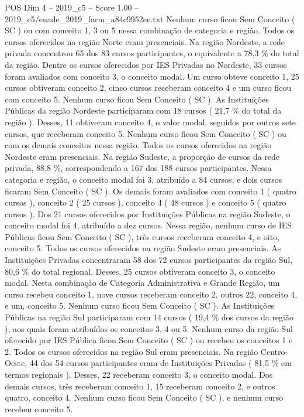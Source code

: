 \begin{textsample}{POS Dim 4 – 2019\_c5 – Score 1.00 – 2019\_c5/enade\_2019\_farm\_a84c9952ee.txt}
Nenhum curso ficou Sem Conceito ( SC ) ou com conceito 1, 3 ou 5 nessa combinação de categoria e região.
Todos os cursos oferecidos na região Norte eram presenciais.
Na região Nordeste, a rede privada concentrou 65 dos 83 cursos participantes, o equivalente a 78,3 \% do total da região.
Dentre os cursos oferecidos por IES Privadas no Nordeste, 33 cursos foram avaliados com conceito 3, o conceito modal.
Um curso obteve conceito 1, 25 cursos obtiveram conceito 2, cinco cursos receberam conceito 4 e um curso ficou com conceito 5.
Nenhum curso ficou Sem Conceito ( SC ).
As Instituições Públicas da região Nordeste participaram com 18 cursos ( 21,7 \% do total da região ).
Desses, 11 obtiveram conceito 4, o valor modal, seguidos por outros sete cursos, que receberam conceito 5.
Nenhum curso ficou Sem Conceito ( SC ) ou com os demais conceitos nessa região.
Todos os cursos oferecidos na região Nordeste eram presenciais.
Na região Sudeste, a proporção de cursos da rede privada, 88,8 \%, correspondendo a 167 dos 188 cursos participantes.
Nessa categoria e região, o conceito modal foi 3, atribuído a 84 cursos, e dois cursos ficaram Sem Conceito ( SC ).
Os demais foram avaliados com conceito 1 ( quatro cursos ), conceito 2 ( 25 cursos ), conceito 4 ( 48 cursos ) e conceito 5 ( quatro cursos ).
Dos 21 cursos oferecidos por Instituições Públicas na região Sudeste, o conceito modal foi 4, atribuído a dez cursos.
Nessa região, nenhum curso de IES Públicas ficou Sem Conceito ( SC ), três cursos receberam conceito 4, e oito, conceito 5.
Todos os cursos oferecidos na região Sudeste eram presenciais.
As Instituições Privadas concentraram 58 dos 72 cursos participantes da região Sul, 80,6 \% do total regional.
Desses, 25 cursos obtiveram conceito 3, o conceito modal.
Nesta combinação de Categoria Administrativa e Grande Região, um curso recebeu conceito 1, nove cursos receberam conceito 2, outros 22, conceito 4, e um, conceito 5.
Nenhum curso ficou Sem Conceito ( SC ).
As Instituições Públicas na região Sul participaram com 14 cursos ( 19,4 \% dos cursos da região ), aos quais foram atribuídos os conceitos 3, 4 ou 5.
Nenhum curso da região Sul oferecido por IES Pública ficou Sem Conceito ( SC ) ou recebeu os conceitos 1 e 2.
Todos os cursos oferecidos na região Sul eram presenciais.
Na região Centro-Oeste, 44 dos 54 cursos participantes eram de Instituições Privadas ( 81,5 \% em termos regionais ).
Desses, 22 receberam conceito 3, o conceito modal.
Dos demais cursos, três receberam conceito 1, 15 receberam conceito 2, e outros quatro, conceito 4.
Nenhum curso ficou Sem Conceito ( SC ), e nenhum curso recebeu conceito 5.

\end{textsample}
